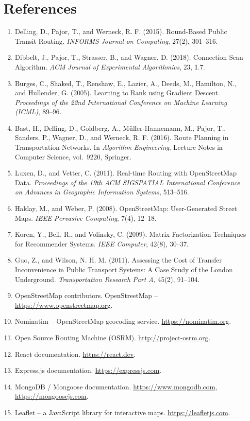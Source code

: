 \documentclass[12pt,a4paper]{report}
\begin{document}
\chapter*{References}
\begin{enumerate}[leftmargin=*]
\item Delling, D., Pajor, T., and Werneck, R. F. (2015). Round-Based Public Transit Routing.
  \textit{INFORMS Journal on Computing}, 27(2), 301--316.
\item Dibbelt, J., Pajor, T., Strasser, B., and Wagner, D. (2018). Connection Scan Algorithm.
  \textit{ACM Journal of Experimental Algorithmics}, 23, 1.7.
\item Burges, C., Shaked, T., Renshaw, E., Lazier, A., Deeds, M., Hamilton, N., and Hullender, G.
  (2005). Learning to Rank using Gradient Descent. \textit{Proceedings of the 22nd International
  Conference on Machine Learning (ICML)}, 89--96.
\item Bast, H., Delling, D., Goldberg, A., Müller-Hannemann, M., Pajor, T., Sanders, P., Wagner,
  D., and Werneck, R. F. (2016). Route Planning in Transportation Networks. In \textit{Algorithm
  Engineering}, Lecture Notes in Computer Science, vol.\ 9220, Springer.
\item Luxen, D., and Vetter, C. (2011). Real-time Routing with OpenStreetMap Data.
  \textit{Proceedings of the 19th ACM SIGSPATIAL International Conference on Advances in
  Geographic Information Systems}, 513--516.
\item Haklay, M., and Weber, P. (2008). OpenStreetMap: User-Generated Street Maps. \textit{IEEE
  Pervasive Computing}, 7(4), 12--18.
\item Koren, Y., Bell, R., and Volinsky, C. (2009). Matrix Factorization Techniques for
  Recommender Systems. \textit{IEEE Computer}, 42(8), 30--37.
\item Guo, Z., and Wilson, N. H. M. (2011). Assessing the Cost of Transfer Inconvenience in Public
  Transport Systems: A Case Study of the London Underground. \textit{Transportation Research
  Part A}, 45(2), 91--104.
\item OpenStreetMap contributors. OpenStreetMap -- \url{https://www.openstreetmap.org}.
\item Nominatim -- OpenStreetMap geocoding service. \url{https://nominatim.org}.
\item Open Source Routing Machine (OSRM). \url{http://project-osrm.org}.
\item React documentation. \url{https://react.dev}.
\item Express.js documentation. \url{https://expressjs.com}.
\item MongoDB / Mongoose documentation. \url{https://www.mongodb.com}, \url{https://mongoosejs.com}.
\item Leaflet -- a JavaScript library for interactive maps. \url{https://leafletjs.com}.
\end{enumerate}
\end{document}
